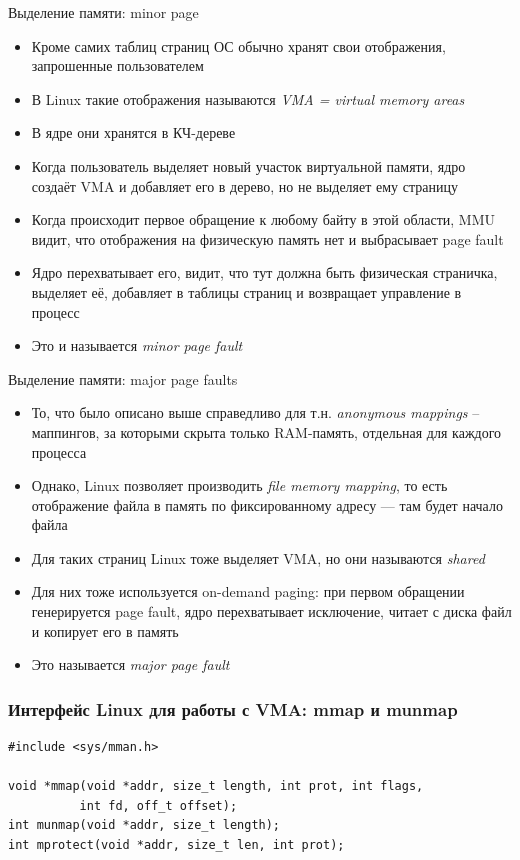 \documentclass[10pt,pdf,hyperref={unicode}]{beamer}
\begin{document}
\begin{frame}{Выделение памяти: minor page}
\begin{itemize}
    \item Кроме самих таблиц страниц ОС обычно хранят свои отображения, запрошенные пользователем
    \item В Linux такие отображения называются \emph{VMA = virtual memory areas}
    \item В ядре они хранятся в КЧ-дереве
    \item Когда пользователь выделяет новый участок виртуальной памяти, ядро создаёт VMA и добавляет его в дерево, но не выделяет ему страницу
    \item Когда происходит первое обращение к любому байту в этой области, MMU видит, что отображения на физическую память нет и выбрасывает page fault
    \item Ядро перехватывает его, видит, что тут должна быть физическая страничка, выделяет её, добавляет в таблицы страниц и возвращает управление в процесс
    \item Это и называется \emph{minor page fault}
\end{itemize}
\end{frame}

\begin{frame}{Выделение памяти: major page faults}
\begin{itemize}
    \item То, что было описано выше справедливо для т.н. \emph{anonymous mappings} -- маппингов, за которыми скрыта только RAM-память, отдельная для каждого процесса
    \item Однако, Linux позволяет производить \emph{file memory mapping}, то есть отображение файла в память по фиксированному адресу — там будет начало файла
    \item Для таких страниц Linux тоже выделяет VMA, но они называются \emph{shared}
    \item Для них тоже используется on-demand paging: при первом обращении генерируется page fault, ядро перехватывает исключение, читает с диска файл и копирует его в память
    \item Это называется \emph{major page fault}
\end{itemize}
\end{frame}

\begin{frame}[fragile]
\frametitle{Интерфейс Linux для работы с VMA: mmap и munmap}
\begin{center}
    \begin{minipage}{0.95\textwidth}
        \begin{verbatim}
#include <sys/mman.h>

void *mmap(void *addr, size_t length, int prot, int flags,
          int fd, off_t offset);
int munmap(void *addr, size_t length);
int mprotect(void *addr, size_t len, int prot);
        \end{verbatim}
    \end{minipage}
\end{center}
\end{frame}
\end{document}
